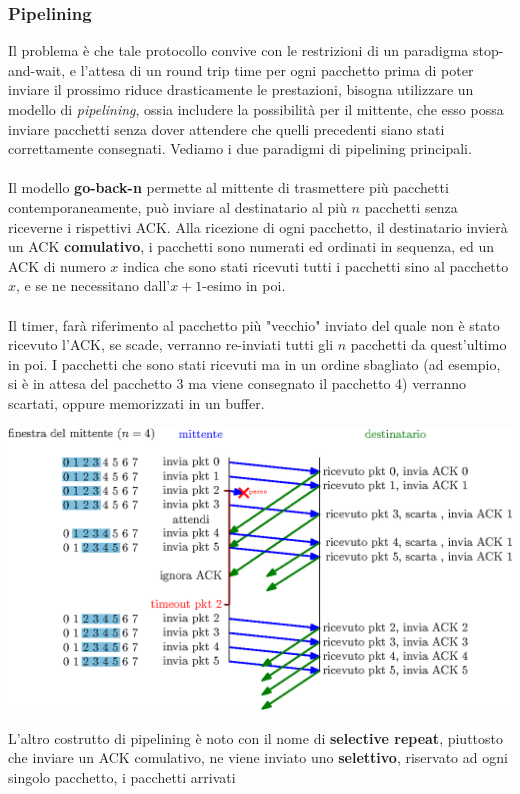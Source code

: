 \documentclass[12pt, letterpaper]{article}
\newcommand{\acc}{\\\hphantom{}\\}
\begin{document}
\subsubsection{Pipelining}
Il problema è che tale protocollo convive con le restrizioni di un paradigma stop-and-wait, e l'attesa di un round trip 
time per ogni pacchetto prima di poter inviare il prossimo riduce drasticamente le prestazioni, bisogna utilizzare un modello 
di \textit{pipelining}, ossia includere la possibilità per il mittente, che esso possa inviare pacchetti senza dover 
attendere che quelli precedenti siano stati correttamente consegnati. Vediamo i due paradigmi di pipelining principali.\acc 
Il modello \textbf{go-back-n} permette al mittente di trasmettere più pacchetti contemporaneamente, può inviare al destinatario 
al più $n$ pacchetti senza riceverne i rispettivi ACK. Alla ricezione di ogni pacchetto, il destinatario invierà un 
ACK \textbf{comulativo}, i pacchetti sono numerati ed ordinati in sequenza, ed un ACK di numero $x$ indica che sono 
stati ricevuti tutti i pacchetti sino al pacchetto $x$, e se ne necessitano dall'$x+1$-esimo in poi.\acc 
Il timer, farà riferimento al pacchetto più "vecchio" inviato del quale non è stato ricevuto l'ACK, se scade, 
verranno re-inviati tutti gli $n$ pacchetti da quest'ultimo in poi. I pacchetti che sono stati ricevuti ma in un ordine 
sbagliato (ad esempio, si è in attesa del pacchetto 3 ma viene consegnato il pacchetto 4) verranno scartati, oppure 
memorizzati in un buffer.\begin{center}
    \includegraphics[width=1\textwidth ]{images/go-back-n.eps}
\end{center} 
L'altro costrutto di pipelining è noto con il nome di \textbf{selective repeat}, piuttosto che inviare un ACK 
comulativo, ne viene inviato uno \textbf{selettivo}, riservato ad ogni singolo pacchetto, i pacchetti arrivati
\end{document}
